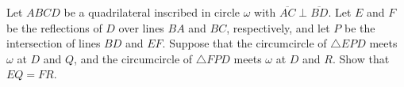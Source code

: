 Let $ABCD$ be a quadrilateral inscribed in circle $\omega$ with $\overline{AC} \perp \overline{BD}$. Let $E$ and $F$ be the reflections of $D$ over lines $BA$ and $BC$, respectively, and let $P$ be the intersection of lines $BD$ and $EF$. Suppose that the circumcircle of $\triangle EPD$ meets $\omega$ at $D$ and $Q$, and the circumcircle of $\triangle FPD$ meets $\omega$ at $D$ and $R$. Show that $EQ = FR$.